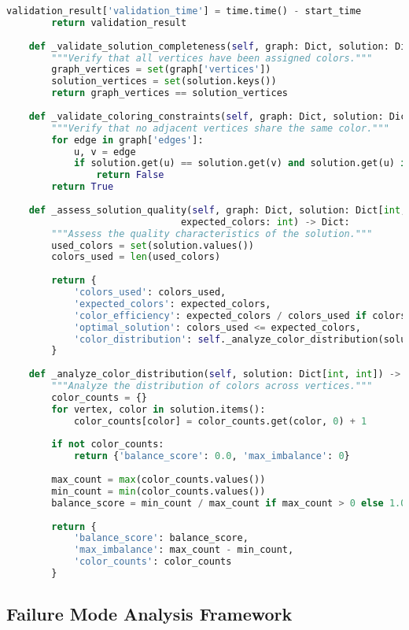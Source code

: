 \begin{lstlisting}[language=Python, caption=External Constraint Satisfaction Verification System]
        validation_result['validation_time'] = time.time() - start_time
        return validation_result
    
    def _validate_solution_completeness(self, graph: Dict, solution: Dict[int, int]) -> bool:
        """Verify that all vertices have been assigned colors."""
        graph_vertices = set(graph['vertices'])
        solution_vertices = set(solution.keys())
        return graph_vertices == solution_vertices
    
    def _validate_coloring_constraints(self, graph: Dict, solution: Dict[int, int]) -> bool:
        """Verify that no adjacent vertices share the same color."""
        for edge in graph['edges']:
            u, v = edge
            if solution.get(u) == solution.get(v) and solution.get(u) is not None:
                return False
        return True
    
    def _assess_solution_quality(self, graph: Dict, solution: Dict[int, int], 
                               expected_colors: int) -> Dict:
        """Assess the quality characteristics of the solution."""
        used_colors = set(solution.values())
        colors_used = len(used_colors)
        
        return {
            'colors_used': colors_used,
            'expected_colors': expected_colors,
            'color_efficiency': expected_colors / colors_used if colors_used > 0 else 0.0,
            'optimal_solution': colors_used <= expected_colors,
            'color_distribution': self._analyze_color_distribution(solution)
        }
    
    def _analyze_color_distribution(self, solution: Dict[int, int]) -> Dict:
        """Analyze the distribution of colors across vertices."""
        color_counts = {}
        for vertex, color in solution.items():
            color_counts[color] = color_counts.get(color, 0) + 1
        
        if not color_counts:
            return {'balance_score': 0.0, 'max_imbalance': 0}
        
        max_count = max(color_counts.values())
        min_count = min(color_counts.values())
        balance_score = min_count / max_count if max_count > 0 else 1.0
        
        return {
            'balance_score': balance_score,
            'max_imbalance': max_count - min_count,
            'color_counts': color_counts
        }
\end{lstlisting}

\subsection{Failure Mode Analysis Framework}
\label{appendix:failure-analysis}


